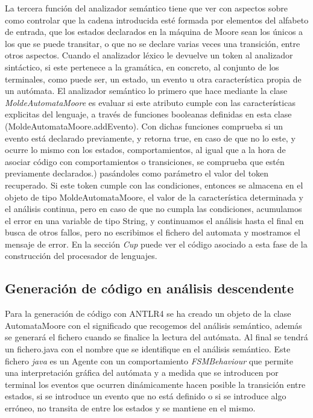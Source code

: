 \documentclass[12pt,a4paper]{article}
\begin{document}
La tercera función del analizador semántico tiene que ver con aspectos sobre como controlar que la cadena introducida esté formada por elementos del alfabeto de entrada, que los estados declarados en la máquina de Moore sean los únicos a los que se puede transitar, o que no se declare varias veces una transición, entre otros aspectos.
\newline \newline
Cuando el analizador léxico le devuelve un token al analizador sintáctico, si este pertenece a la gramática, en concreto,  al conjunto de los terminales, como puede ser, un estado, un evento u otra característica propia de un autómata.\newline
El analizador semántico lo primero que hace mediante la clase \textit{MoldeAutomataMoore} es evaluar si este atributo cumple con las características explicitas del lenguaje, a través de funciones booleanas definidas en esta clase (MoldeAutomataMoore.addEvento).\newline
Con dichas funciones comprueba si un evento está declarado previamente, y retorna true, en caso de que no lo este, y ocurre lo mismo con los estados, comportamientos, al igual que a la hora de asociar código con comportamientos o transiciones, se comprueba que estén previamente declarados.) pasándoles como parámetro el valor del token recuperado.
\newline \newline
Si este token cumple con las condiciones, entonces se almacena en el objeto de tipo MoldeAutomataMoore, el valor de la característica determinada y el análisis continua, pero en caso de que no cumpla las condiciones, acumulamos el error en una variable de tipo String, y continuamos el análisis hasta el final en busca de otros fallos, pero no escribimos el fichero del automata y mostramos el mensaje de error.
\newline\newline
En la sección \textit{Cup} puede ver el código asociado a esta fase de la construcción del procesador de lenguajes.

\subsection{Generación de código en análisis descendente}
Para la generación de código con ANTLR4 se ha creado un objeto de la clase AutomataMoore con el significado que recogemos del análisis semántico, además se generará el fichero cuando se finalice la lectura del autómata.
Al final se tendrá un fichero.java con el nombre que se identifique en el análisis semántico.\newline\newline
Este fichero \textit{java} es un Agente con un comportamiento \textit{FSMBehaviour} que permite una
interpretación gráfica del autómata y a medida que se introducen por
terminal los eventos que ocurren dinámicamente hacen posible la transición entre estados, si se introduce un evento que no está definido o si se introduce algo erróneo, no transita de entre los estados y se mantiene en el mismo.
\end{document}
